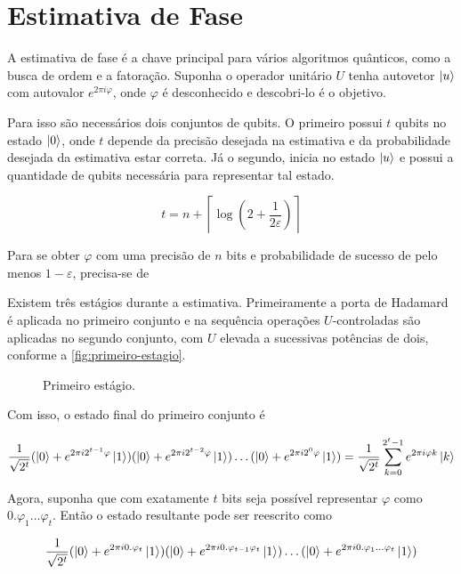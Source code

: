 \section{Estimativa de Fase}\label{sec:estimativa-de-fase}

A estimativa de fase é a chave principal para vários algoritmos
quânticos, como a busca de ordem e a fatoração.
Suponha o operador unitário \(U\) tenha autovetor \(\ket{u}\) com autovalor
\(e^{2\pi i \varphi}\), onde \(\varphi\) é desconhecido e descobri-lo é
o objetivo.

Para isso são necessários dois conjuntos de qubits.
O primeiro possui \(t\) qubits no estado \(\ket{0}\), onde \(t\) depende da precisão
desejada na estimativa e da probabilidade desejada da estimativa estar
correta.
Já o segundo, inicia no estado \(\ket{u}\) e possui a quantidade de qubits necessária para representar tal estado.

\[
    t = n + \left\lceil \log \left( 2 + \dfrac{1}{2\varepsilon}\right) \right\rceil
\]

Para se obter \(\varphi\) com uma precisão de \(n\) bits e probabilidade
de sucesso de pelo menos \(1 - \varepsilon\), precisa-se de

Existem três estágios durante a estimativa.
Primeiramente a porta de Hadamard é aplicada no primeiro conjunto e na sequência operações
\(U\)-controladas são aplicadas no segundo conjunto, com \(U\) elevada a
sucessivas potências de dois, conforme a \autoref{fig:primeiro-estagio}.

\begin{figure}[!htb]
    \centering
    
    \caption{Primeiro estágio.}
    \label{fig:primeiro-estagio}
\end{figure}

Com isso, o estado final do primeiro conjunto é

\[
    \dfrac{1}{\sqrt{2^t}} (\ket{0} + e^{2\pi i 2^{t-1}\varphi} \ket{1}) (\ket{0} + e^{2\pi i 2^{t-2}\varphi} \ket{1}) \dots (\ket{0} + e^{2\pi i 2^{0}\varphi} \ket{1}) = \dfrac{1}{\sqrt{2^t}} \sum_{k=0}^{2^t - 1} e^{2\pi i \varphi k} \ket{k}
\]

Agora, suponha que com exatamente \(t\) bits seja possível representar
\(\varphi\) como \(0.\varphi_1 \dots \varphi_t\).
Então o estado resultante pode ser reescrito como

\[
    \dfrac{1}{\sqrt{2^t}} (\ket{0} + e^{2\pi i 0.\varphi_t} \ket{1}) (\ket{0} + e^{2\pi i 0.\varphi_{t-1}\varphi_t} \ket{1}) \dots (\ket{0} + e^{2\pi i 0.\varphi_1 \dots \varphi_t} \ket{1})
\]

